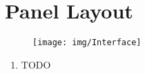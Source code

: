 \documentclass[12pt,letter]{article}
\begin{document}

\clearpage
\section{Panel Layout}

\begin{figure}[!htp]
\centering
\texttt{[image: img/Interface]}
\end{figure}

\clearpage
\begin{enumerate}
  \item TODO
\end{enumerate}


\clearpage
\renewcommand\refname{References}
\nocite{*}


\end{document}
